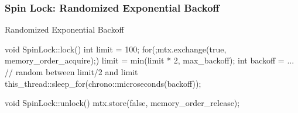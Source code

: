\documentclass[UTF8,lualatex]{ctexbeamer}
\begin{document}
\begin{frame}[fragile]
    \frametitle{Spin Lock: Randomized Exponential Backoff}
    \scriptsize
    \begin{block}{Randomized Exponential Backoff}
        \begin{cppcode}
            void SpinLock::lock() {
                int limit = 100;
                for(;mtx.exchange(true, memory_order_acquire);) {
                    limit = min(limit * 2, max_backoff);
                    int backoff = ... // random between limit/2 and limit
                    this_thread::sleep_for(chrono::microseconds(backoff));
                }
            }

            void SpinLock::unlock() {
                mtx.store(false,
                    memory_order_release);
            }
        \end{cppcode}
    \end{block}
\end{frame}

\end{document}
